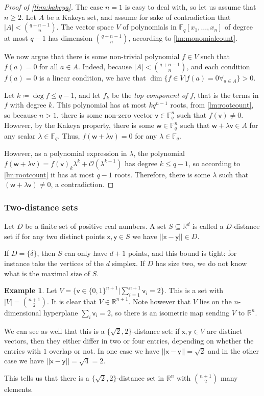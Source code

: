 \documentclass[12pt]{amsart}
\theoremstyle{definition}
\newtheorem{smpl}[thm]{Example}
\newcommand{\R}{\mathbb{R}}
\newcommand{\F}{\mathbb{F}}
\newcommand{\vv}{\mathsf{v}}
\newcommand{\vw}{\mathsf{w}}
\newcommand{\vx}{\mathsf{x}}
\newcommand{\vy}{\mathsf{y}}
\begin{document}
\begin{proof}[Proof of \cref{thm:kakeya}]
The case $n=1$ is easy to deal with, so let us assume that $n \geq 2$.
Let $A$ be a Kakeya set, and assume for sake of contradiction that $|A| < \binom{q+n-1}{n}$.
The vector space $V$ of polynomials in $\F_q[x_1, \ldots, x_n]$ of degree at most $q-1$ has dimension $\binom{q+n-1}{n}$, according to \cref{lm:monomialcount}.

We now argue that there is some non-trivial polynomial $f\in V$ such that $f(a) = 0 $ for all $a \in A$.
Indeed, because $|A| < \binom{q+n-1}{n}$, and each condition $f(a) = 0 $ is a linear condition, we have that $\dim \{ f \in V | f(a) = 0 \forall_{a \in A} \} > 0$.

Let $k \coloneqq \deg f\leq q-1$, and let $f_k$ be the \textit{top component of} $f$, that is the terms in $f$ with degree $k$.
This polynomial has at most $k q^{n-1}$ roots, from \cref{lm:rootcount}, so because $n>1$, there is some non-zero vector $\vv \in \F_q^n$ such that $f(\vv) \neq 0$.
However, by the Kakeya property, there is some $\vw \in \F_q^n$ such that $\vw + \lambda \vv \in A $ for any scalar $\lambda \in \F_q$.
Thus, $f(\vw + \lambda \vv ) = 0$ for any $\lambda \in \F_q$.

However, as a polynomial expression in $\lambda $, the polynomial $f(\vw + \lambda \vv )= f(\vv)_k \lambda^k + \mathcal O (\lambda^{k-1})$ has degree $k \leq q-1$, so according to \cref{lm:rootcount} it has at most $q-1$ roots.
Therefore, there is some $\lambda $ such that $(\vw + \lambda \vv ) \neq 0$, a contradiction.
\end{proof}


\subsubsection*{Two-distance sets}

Let $D$ be a finite set of positive real numbers.
A set $S\subseteq \R^d$ is called a $D$-distance set if for any two distinct points $\vx, \vy\in S$ we have $||\vx - \vy || \in D$.

If $D = \{ \delta \}$, then $S$ can only have $d+1$ points, and this bound is tight: for instance take the vertices of the $d$ simplex.
If $D$ has size two, we do not know what is the maximal size of $S$.

\begin{smpl}
Let $V = \{ \vv \in \{0, 1\}^{n+1} | \sum_{i=1}^{n+1} \vv_i = 2 \}$.
This is a set with $|V| = \binom{n+1}{2}$.
It is clear that $V\in \R^{n+1}$.
Note however that $V$ lies on the $n$-dimensional hyperplane $\sum_i \vv_i = 2$, so there is an isometric map sending $V$ to $\R^n$.

We can see as well that this is a $\{\sqrt{2}, 2\}$-distance set: if $\vx, \vy \in V$ are distinct vectors, then they either differ in two or four entries, depending on whether the entries with $1$ overlap or not.
In one case we have $||\vx - \vy || = \sqrt{2}$ and in the other case we have $||\vx - \vy || = \sqrt{4} = 2$.

This tells us that there is a $\{\sqrt{2}, 2\}$-distance set in $\R^n$ with $\binom{n+1}{2}$ many elements.
\end{smpl}
\end{document}
